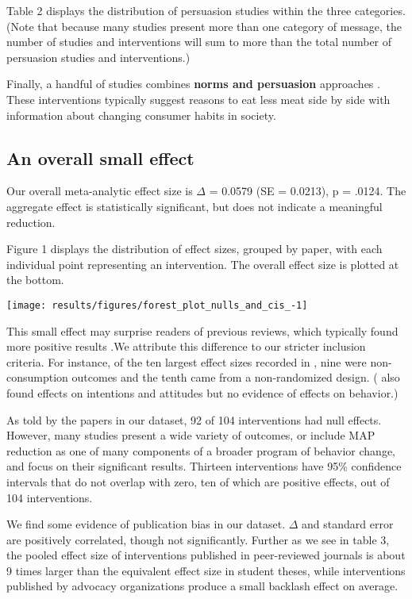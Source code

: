 \documentclass[sn-nature,pdflatex]{sn-jnl}
\begin{document}
Table 2 displays the distribution of persuasion studies within the three
categories. (Note that because many studies present more than one
category of message, the number of studies and interventions will sum to
more than the total number of persuasion studies and interventions.)

Finally, a handful of studies combines \textbf{norms and persuasion}
approaches
\citep{hennessy2016, carfora2023, lacroix2020, mattson2020, piester2020}.
These interventions typically suggest reasons to eat less meat side by
side with information about changing consumer habits in society.

\subsection{An overall small effect}\label{sec2.2}

Our overall meta-analytic effect size is \(\Delta\) = 0.0579 (SE =
0.0213), p = .0124. The aggregate effect is statistically significant,
but does not indicate a meaningful reduction.

Figure 1 displays the distribution of effect sizes, grouped by paper,
with each individual point representing an intervention. The overall
effect size is plotted at the bottom.

\texttt{[image: results/figures/forest\_plot\_nulls\_and\_cis\_-1]}

This small effect may surprise readers of previous reviews, which
typically found more positive results
\citep{mathur2021meta, meier2022, chang2023}.We attribute this
difference to our stricter inclusion criteria. For instance, of the ten
largest effect sizes recorded in \citep{mathur2021effectiveness}, nine
were non-consumption outcomes and the tenth came from a non-randomized
design. (\citep{bianchi2018conscious} also found effects on intentions
and attitudes but no evidence of effects on behavior.)

As told by the papers in our dataset, 92 of 104 interventions had null
effects. However, many studies present a wide variety of outcomes, or
include MAP reduction as one of many components of a broader program of
behavior change, and focus on their significant results. Thirteen
interventions have 95\% confidence intervals that do not overlap with
zero, ten of which are positive effects, out of 104 interventions.

We find some evidence of publication bias in our dataset. \(\Delta\) and
standard error are positively correlated, though not significantly.
Further as we see in table 3, the pooled effect size of interventions
published in peer-reviewed journals is about 9 times larger than the
equivalent effect size in student theses, while interventions published
by advocacy organizations produce a small backlash effect on average.
\end{document}
